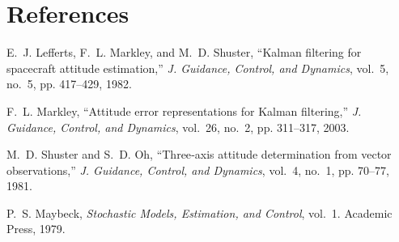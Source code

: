 \documentclass[12pt,letterpaper]{article}
\begin{document}
\section*{References}
\begin{thebibliography}{9}
E.~J. Lefferts, F.~L. Markley, and M.~D. Shuster, “Kalman filtering for spacecraft attitude estimation,” \emph{J. Guidance, Control, and Dynamics}, vol.~5, no.~5, pp. 417–429, 1982.

F.~L. Markley, “Attitude error representations for Kalman filtering,” \emph{J. Guidance, Control, and Dynamics}, vol.~26, no.~2, pp. 311–317, 2003.

M.~D. Shuster and S.~D. Oh, “Three‐axis attitude determination from vector observations,” \emph{J. Guidance, Control, and Dynamics}, vol.~4, no.~1, pp. 70–77, 1981.

P.~S. Maybeck, \emph{Stochastic Models, Estimation, and Control}, vol.~1. Academic Press, 1979.

\end{thebibliography}
\end{document}
